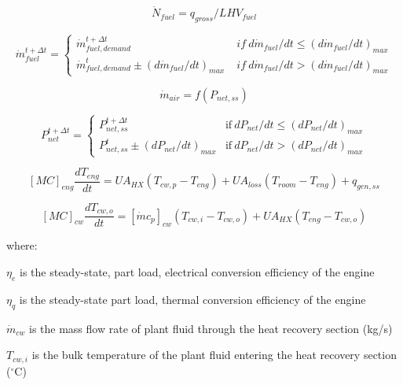 \begin{equation}
{\dot N_{fuel}} = {q_{gross}}/LH{V_{fuel}}
\end{equation}

\begin{equation}
\dot m_{fuel}^{t+\Delta t} = \left\{
    \begin{array}{cl}
      \dot m_{fuel,demand}^{t+\Delta t}       &\; if~d\dot m_{fuel} / dt \le (d\dot m_{fuel}/dt)_{max} \\
      \dot m_{fuel,demand}^t \pm (d\dot m_{fuel}/dt)_{max}      &\; if~d\dot m_{fuel} / dt > (d\dot m_{fuel}/dt)_{max} 
    \end{array}
  \right.
\end{equation}

\begin{equation}
{\dot m_{air}} = f({P_{net,ss}})
\end{equation}

\begin{equation}
P_{net}^{t+\Delta t} = \left\{
    \begin{array}{cl}
      P_{net,ss}^{t+\Delta t}                   & \text{if}~dP_{net} / dt \le (dP_{net}/dt)_{max} \\
      P_{net,ss}^t \pm (dP_{net}/dt)_{max}      & \text{if}~dP_{net} / dt > (dP_{net}/dt)_{max} 
    \end{array}
  \right.
\end{equation}

\begin{equation}
{[MC]_{eng}}\frac{{d{T_{eng}}}}{{dt}} = U{A_{HX}}\left( {{T_{cw,p}} - {T_{eng}}} \right) + U{A_{loss}}\left( {{T_{room}} - {T_{eng}}} \right) + {q_{gen,ss}}
\end{equation}

\begin{equation}
{[MC]_{cw}}\frac{{d{T_{cw,o}}}}{{dt}} = {[\dot m{c_p}]_{cw}}\left( {{T_{cw,i}} - {T_{cw,o}}} \right) + U{A_{HX}}\left( {{T_{eng}} - {T_{cw,o}}} \right)
\end{equation}

where:

\({\eta_e}\) is the steady-state, part load, electrical conversion efficiency of the engine

\({\eta_q}\) is the steady-state part load, thermal conversion efficiency of the engine

\({\dot m_{cw}}\) is the mass flow rate of plant fluid through the heat recovery section (kg/s)

\({T_{cw,i}}\) is the bulk temperature of the plant fluid entering the heat recovery section (\(^{\circ}\)C)

